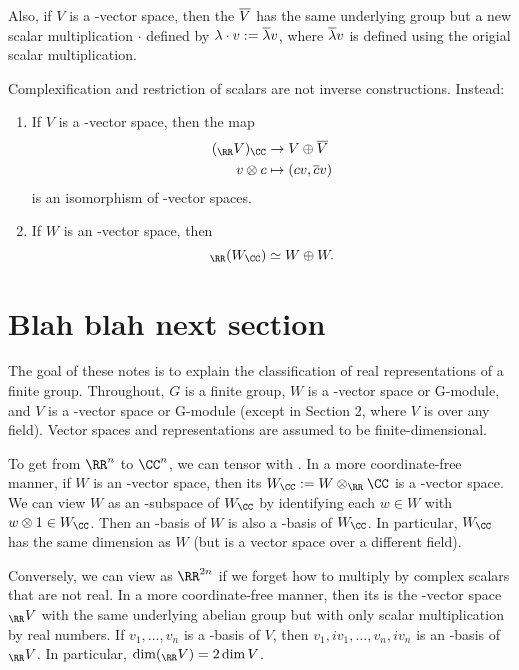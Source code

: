 \documentclass{scrartcl}
\begin{document}
Also, if $V$ is a \CC-vector space, then the  $\overline{V}$ has the same underlying group but a new scalar multiplication $\cdot$ defined by $\lambda\cdot v := \overline{\lambda}v$, where $\overline{\lambda}v$ is defined using the origial scalar multiplication.

Complexification and restriction of scalars are not inverse constructions. Instead:
\begin{proposition}
    \hfill
    \begin{enumerate}[font=\normalfont]
        \item If $V$ is a \CC-vector space, then the map \begin{align*}
            (_{\RR} V)_{\CC} &\rightarrow V \oplus \ol{V} \\
            v\otimes c &\mapsto (cv,\ol{c}v) \\
        \end{align*} is an isomorphism of \CC-vector spaces.
        \item If $W$ is an \RR-vector space, then \[_{\RR}(W_{\CC}) \simeq W\oplus W.\]
    \end{enumerate}
\end{proposition}

\section{Blah blah next section}


The goal of these notes is to explain the classification of real representations of a finite
group. Throughout, $G$ is a finite group, $W$ is a \RR-vector space or \RR G-module, and $V$ is a
\CC-vector space or \CC G-module (except in Section 2, where $V$ is over any field). Vector spaces
and representations are assumed to be finite-dimensional.

To get from $\RR^n$ to $\CC^n$, we can tensor with \CC. In a more coordinate-free
manner, if $W$ is an \RR-vector space, then its  $W_{\CC} := W \otimes_{\RR} \CC$ is a \CC-vector
space. We can view $W$ as an \RR-subspace of $W_{\CC}$ by identifying each $w \in W$ with $w \otimes 1 \in W_{\CC}$.
Then an \RR-basis of $W$ is also a \CC-basis of $W_{\CC}$. In particular, $W_{\CC}$ has the same dimension as
$W$ (but is a vector space over a different field).

Conversely, we can view \CC[n] as $\RR^{2n}$ if we forget how to multiply by complex scalars that are not real. In a more coordinate-free manner, then its  is the \RR-vector space $_{\RR} V$ with the same underlying abelian group but with only scalar multiplication by real numbers. If $v_1,\dots,v_n$ is a \CC-basis of $V$, then $v_1, iv_1,\dots,v_n,iv_n$ is an \RR-basis of $_{\RR} V$. In particular, $\dim(_{\RR} V) = 2\dim V$.
\end{document}
